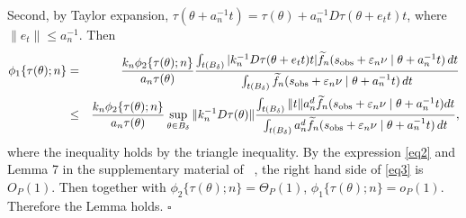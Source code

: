 \documentclass{article}
\begin{document}
	Second, by Taylor expansion, $\tau(\theta+a_{n}^{-1}t)=\tau(\theta)+a_{n}^{-1}D\tau(\theta+e_{t}t)t$,
	where $\|e_{t}\|\leq a_{n}^{-1}$. Then 
	\begin{eqnarray}
	\phi_{1}\{\tau(\theta);n\} & = & \frac{k_{n}\phi_{2}\{\tau(\theta);n\}}{a_{n}\tau(\theta)}\frac{\int_{t(B_{\delta})}|k_{n}^{-1}D\tau(\theta+e_{t}t)t|\widetilde{f}_{n}(s_{{\rm obs}}+\varepsilon_{n}\nu\mid\theta+a_{n}^{-1}t)\,dt}{\int_{t(B_{\delta})}\widetilde{f}_{n}(s_{{\rm obs}}+\varepsilon_{n}\nu\mid\theta+a_{n}^{-1}t)\,dt}\nonumber \\
	& \leq & \frac{k_{n}\phi_{2}\{\tau(\theta);n\}}{a_{n}\tau(\theta)}\sup_{\theta\in B_{\delta}}\|k_{n}^{-1}D\tau(\theta)\|\frac{\int_{t(B_{\delta})}\|t\|a_{n}^{d}\widetilde{f}_{n}(s_{{\rm obs}}+\varepsilon_{n}\nu\mid\theta+a_{n}^{-1}t)dt}{\int_{t(B_{\delta})}a_{n}^{d}\widetilde{f}_{n}(s_{{\rm obs}}+\varepsilon_{n}\nu\mid\theta+a_{n}^{-1}t)\,dt},\label{eq3}
	\end{eqnarray}
	where the inequality holds by the triangle inequality. By the expression
	\eqref{eq2} and Lemma 7 in the supplementary material of ~\cite{Li2016},
	the right hand side of \eqref{eq3} is $O_{P}(1)$. Then together
	with $\phi_{2}\{\tau(\theta);n\}=\Theta_{P}(1)$, $\phi_{1}\{\tau(\theta);n\}=o_{P}(1).$
	Therefore the Lemma holds.
	\hfill{$\square$} 
\end{document}
